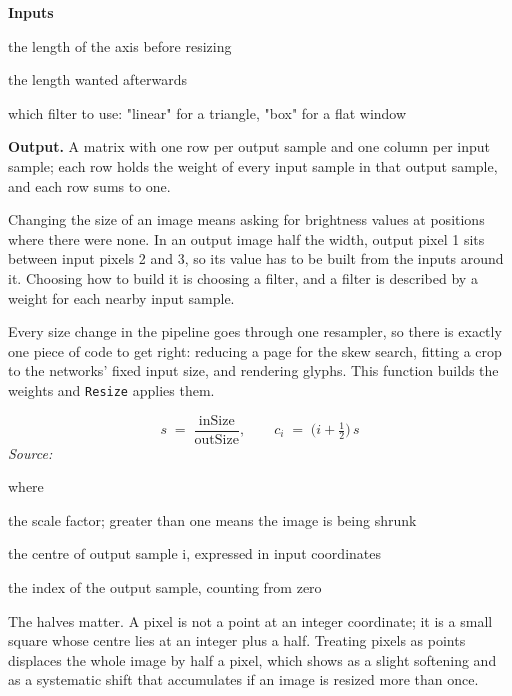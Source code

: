 \noindent\textbf{Inputs}
\begin{description}[leftmargin=2.2em,style=nextline,font=\normalfont\ttfamily]\setlength\itemsep{1pt}
  \item[{inSize}] \normalfont the length of the axis before resizing
  \item[{outSize}] \normalfont the length wanted afterwards
  \item[{kernel}] \normalfont which filter to use: "linear" for a triangle, "box" for a flat window
\end{description}

\noindent\textbf{Output.} A matrix with one row per output sample and one column per input sample; each row holds the weight of every input sample in that output sample, and each row sums to one.


Changing the size of an image means asking for brightness values at positions where there were none. In an output image half the width, output pixel 1 sits between input pixels 2 and 3, so its value has to be built from the inputs around it. Choosing how to build it is choosing a filter, and a filter is described by a weight for each nearby input sample.


Every size change in the pipeline goes through one resampler, so there is exactly one piece of code to get right: reducing a page for the skew search, fitting a crop to the networks' fixed input size, and rendering glyphs. This function builds the weights and \texttt{Resize} applies them.



\begin{equation}
s \;=\; \frac{\mathrm{inSize}}{\mathrm{outSize}}, \qquad c_i \;=\; \big(i + \tfrac{1}{2}\big)\, s
\end{equation}
\noindent\emph{Source: }\cite{wolberg1990}


\noindent where
\begin{description}[leftmargin=2.4em,style=nextline,font=\normalfont\ttfamily]\setlength\itemsep{1pt}
  \item[{$s$}] \normalfont the scale factor; greater than one means the image is being shrunk
  \item[{$c_i$}] \normalfont the centre of output sample i, expressed in input coordinates
  \item[{$i$}] \normalfont the index of the output sample, counting from zero
\end{description}
The halves matter. A pixel is not a point at an integer coordinate; it is a small square whose centre lies at an integer plus a half. Treating pixels as points displaces the whole image by half a pixel, which shows as a slight softening and as a systematic shift that accumulates if an image is resized more than once.


